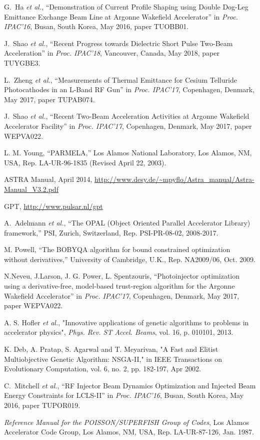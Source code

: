 \documentclass[letterpaper,  %
              ]{jacow-2_3}   %
\begin{document}
\begin{thebibliography}{99}
G.~Ha \emph{et al.}, “Demonstration of Current Profile 
Shaping using Double Dog-Leg Emittance Exchange Beam 
Line at Argonne Wakefield Accelerator”
in \textit{Proc. IPAC’16}, 
Busan, South Korea, May 2016, 
paper TUOBB01.

J.~Shao \emph{et al.}, “Recent Progress towards Dielectric Short Pulse Two-Beam Acceleration”
in \textit{Proc. IPAC’18}, 
Vancouver, Canada, May 2018, 
paper TUYGBE3.

L.~Zheng \emph{et al.}, “Measurements of Thermal Emittance 
for Cesium Telluride Photocathodes in an L-Band RF Gun”
in \textit{Proc. IPAC’17}, 
Copenhagen, Denmark, May 2017, 
paper TUPAB074.

J.~Shao \emph{et al.}, “Recent Two-Beam 
Acceleration Activities at Argonne Wakefield Accelerator Facility”
in \textit{Proc. IPAC’17}, 
Copenhagen, Denmark, May 2017, 
paper WEPVA022.

L. M. Young, “PARMELA,”
Los Alamos National Laboratory, 
Los Alamos, NM, USA,
Rep. LA-UR-96-1835 (Revised April 22, 2003).

ASTRA Manual, April 2014, 
\url{http://www.desy.de/~mpyflo/Astra_manual/Astra-Manual_V3.2.pdf}

GPT,  \url{http://www.pulsar.nl/gpt}

A.~Adelmann \emph{et al.},
“The OPAL (Object Oriented Parallel Accelerator Library) framework,”
PSI, Zurich, Switzerland,
Rep. PSI-PR-08-02, 2008-2017.

M. Powell, “The BOBYQA algorithm for bound constrained
optimization without derivatives,” University of Cambridge,
U.K., Rep. NA2009/06, Oct. 2009.

N.Neveu, J.Larson, J. G. Power, L. Spentzouris, 
“Photoinjector optimization using a derivative-free, model-based trust-region algorithm for the Argonne Wakefield Accelerator”
in \textit{Proc. IPAC’17}, 
Copenhagen, Denmark, May 2017, 
paper WEPVA022.

A. S. Hofler \emph{et al.},
"Innovative applications of genetic algorithms to 
problems in accelerator physics",
\emph{Phys. Rev. ST Accel. Beams}, vol. 16,
p. 010101, 2013. 

K. Deb, A. Pratap, S. Agarwal and T. Meyarivan, 
"A Fast and Elitist Multiobjective Genetic Algorithm: NSGA-II," 
in IEEE Transactions on Evolutionary Computation, 
vol. 6, no. 2, pp. 182-197, Apr 2002.

C.~Mitchell \emph{et al.}, “RF Injector Beam Dynamics Optimization 
and Injected Beam Energy Constraints for LCLS-II”
in \textit{Proc. IPAC’16}, 
Busan, South Korea, May 2016, 
paper TUPOR019.






\emph{Reference Manual for the POISSON/SUPERFISH Group of 
	Codes},  Los Alamos Accelerator Code Group,  
 Los Alamos, NM, USA, 
 Rep. LA-UR-87-126, Jan. 1987.
\end{thebibliography}
\end{document}
